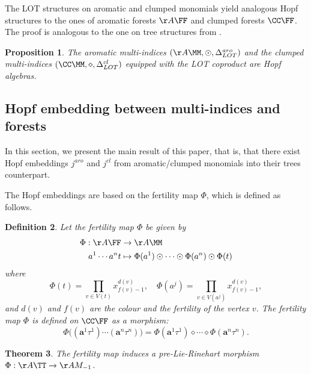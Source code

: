 \documentclass[a4paper,11pt]{article}
\newtheorem{theorem}{Theorem}[section]
\newtheorem{definition}[theorem]{Definition}
\newtheorem{proposition}[theorem]{Proposition}
\begin{document}
The LOT structures on aromatic and clumped monomials yield analogous Hopf structures to the ones of aromatic forests $\AA\FF$ and clumped forests $\CC\FF$. The proof is analogous to the one on tree structures from \cite{Bronasco22cef}.
\begin{proposition}
The aromatic multi-indices $(\AA\MM,\odot, \Delta_{LOT}^{aro})$ and the clumped multi-indices $(\CC\MM, \diamond, \Delta_{LOT}^{cl})$ equipped with the LOT coproduct are Hopf algebras.
\end{proposition}


















\subsection{Hopf embedding between multi-indices and forests}

In this section, we present the main result of this paper, that is, that there exist Hopf embeddings $j^{aro}$ and $j^{cl}$ from aromatic/clumped monomials into their trees counterpart.


The Hopf embeddings are based on the fertility map $\Phi$, which is defined as follows.
\begin{definition}\label{fertilitymap}
Let the fertility map $\Phi$ be given by
\begin{align*}
\Phi: \AA\FF &\rightarrow \AA \MM\\
a^1\cdots a^n t &\mapsto \Phi(a^1)\odot \cdots \odot \Phi(a^n)\odot \Phi(t)
\end{align*}
where
\[\Phi(t)=\prod_{v\in V(t)}x_{f(v) - 1}^{d(v)},\quad
\Phi(a^j)=\prod_{v\in V(a^j)}x_{f(v) - 1}^{d(v)},\]
and $d(v)$ and $f(v)$ are the colour and the fertility of the vertex $v$. 
The fertility map $\Phi$ is defined on $\CC\FF$ as a morphism:
\[
\Phi\big((\mathbf{a}^1\tau^1)\cdots (\mathbf{a}^n\tau^n)\big)=\Phi(\mathbf{a}^1\tau^1)\diamond \cdots \diamond \Phi(\mathbf{a}^n\tau^n).
\]
\end{definition}


\begin{theorem}
The fertility map induces a pre-Lie-Rinehart morphism $\Phi: \AA\TT \rightarrow \AA M_{-1}$.
\end{theorem}
\end{document}
